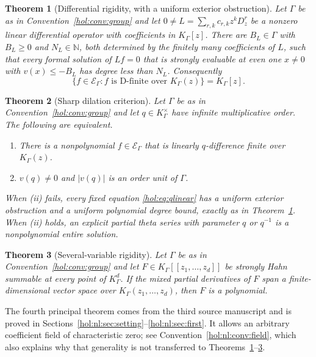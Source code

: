 \documentclass[11pt]{article}
\numberwithin{equation}{section}
\newtheorem{maintheorem}{Theorem}
\theoremstyle{definition}
\theoremstyle{remark}
\newcommand{\N}{\mathbb N}
\newcommand{\K}{K_\Gamma}
\newcommand{\E}{\mathcal E_\Gamma}
\newcommand{\abs}[1]{\lvert#1\rvert}
\begin{document}
\begin{maintheorem}[Differential rigidity, with a uniform exterior obstruction]
\label{hol:main:ode}
Let $\Gamma$ be as in Convention~\ref{hol:conv:group} and let
$0\ne L=\sum_{r,k}c_{r,k}z^kD_z^r$ be a nonzero linear differential operator
with coefficients in $\K[z]$. There are $B_L\in\Gamma$ with $B_L\ge0$ and
$N_L\in\N$, both determined by the finitely many coefficients of $L$, such
that every formal solution of $Lf=0$ that is strongly evaluable at even one
$x\ne0$ with $v(x)\le-B_L$ has degree less than $N_L$. Consequently
\[
 \{f\in\E:f\text{ is D-finite over }\K(z)\}=\K[z].
\]
\end{maintheorem}

\begin{maintheorem}[Sharp dilation criterion]\label{hol:main:q}
Let $\Gamma$ be as in Convention~\ref{hol:conv:group} and let $q\in\K^\times$
have infinite multiplicative order. The following are equivalent.
\begin{enumerate}[label=\textup{(\roman*)}]
\item There is a nonpolynomial $f\in\E$ that is linearly $q$-difference finite
over $\K(z)$.
\item $v(q)\ne0$ and $\abs{v(q)}$ is an order unit of $\Gamma$.
\end{enumerate}
When \textup{(ii)} fails, every fixed equation \eqref{hol:eq:qlinear} has a
uniform exterior obstruction and a uniform polynomial degree bound, exactly as
in Theorem~\ref{hol:main:ode}. When \textup{(ii)} holds, an explicit partial
theta series with parameter $q$ or $q^{-1}$ is a nonpolynomial entire
solution.
\end{maintheorem}

\begin{maintheorem}[Several-variable rigidity]\label{hol:main:multi}
Let $\Gamma$ be as in Convention~\ref{hol:conv:group} and let
$F\in\K[[z_1,\ldots,z_d]]$ be strongly Hahn summable at every point of $\K^d$.
If the mixed partial derivatives of $F$ span a finite-dimensional vector space
over $\K(z_1,\ldots,z_d)$, then $F$ is a polynomial.
\end{maintheorem}

The fourth principal theorem comes from the third source manuscript and is
proved in Sections~\ref{hol:nl:sec:setting}--\ref{hol:nl:sec:first}. It
allows an arbitrary coefficient field of characteristic zero; see
Convention~\ref{hol:nl:conv:field}, which also explains why that generality
is not transferred to Theorems~\ref{hol:main:ode}--\ref{hol:main:multi}.
\end{document}
